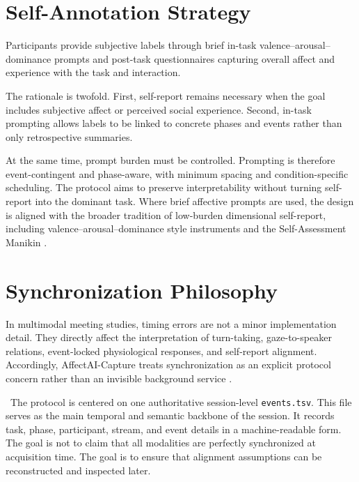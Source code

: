\documentclass[runningheads]{llncs}
\begin{document}
\section{Self-Annotation Strategy}

Participants provide subjective labels through brief in-task valence--arousal--dominance prompts and post-task questionnaires capturing overall affect and experience with the task and interaction.

The rationale is twofold. First, self-report remains necessary when the goal includes subjective affect or perceived social experience. Second, in-task prompting allows labels to be linked to concrete phases and events rather than only retrospective summaries.

At the same time, prompt burden must be controlled. Prompting is therefore event-contingent and phase-aware, with minimum spacing and condition-specific scheduling. The protocol aims to preserve interpretability without turning self-report into the dominant task. Where brief affective prompts are used, the design is aligned with the broader tradition of low-burden dimensional self-report, including valence--arousal--dominance style instruments and the Self-Assessment Manikin \cite{bradley1994_sam}.

\section{Synchronization Philosophy}


\noindent In multimodal meeting studies, timing errors are not a minor implementation detail. They directly affect the interpretation of turn-taking, gaze-to-speaker relations, event-locked physiological responses, and self-report alignment. Accordingly, AffectAI-Capture treats synchronization as an explicit protocol concern rather than an invisible background service \cite{anguera2012_diarization_review}.


\noindent\ The protocol is centered on one authoritative session-level \texttt{events.tsv}. This file serves as the main temporal and semantic backbone of the session. It records task, phase, participant, stream, and event details in a machine-readable form.
The goal is not to claim that all modalities are perfectly synchronized at acquisition time. The goal is to ensure that alignment assumptions can be reconstructed and inspected later.
\end{document}
